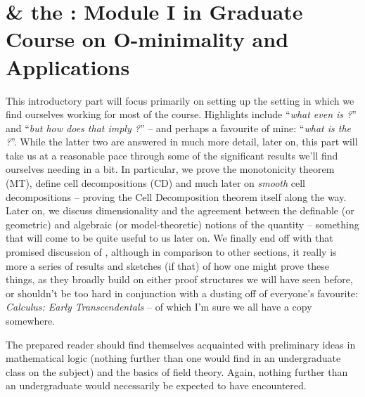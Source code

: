 % 
%
%

\setcounter{section}{1}
\setcounter{chapter}{0}

\chapter[\Omy \& the \pwT]{\Omy \& the \pwT: Module I in Graduate Course on O-minimality and Applications}
\noindent This introductory part will focus primarily on setting up the setting in which we find ourselves working for most of the course. Highlights include ``\emph{what even is \omy?}'' and ``\emph{but how does that imply \pw?}'' -- and perhaps a favourite of mine: ``\emph{what is the \pwt?}''. While the latter two are answered in much more detail, later on, this part will take us at a reasonable pace through some of the significant results we'll find ourselves needing in a bit. In particular, we prove the monotonicity theorem (MT), define cell decompositions (CD) and much later on \emph{smooth} cell decompositions -- proving the Cell Decomposition theorem itself along the way. Later on, we discuss dimensionality and the agreement between the definable (or geometric) and algebraic (or model-theoretic) notions of the quantity -- something that will come to be quite useful to us later on. We finally end off with that promised discussion of \scds, although in comparison to other sections, it really is more a series of results and sketches (if that) of how one might prove these things, as they broadly build on either proof structures we will have seen before, or shouldn't be too hard in conjunction with a dusting off of everyone's favourite: \textit{Calculus: Early Transcendentals} -- of which I'm sure we all have a copy somewhere.

The prepared reader should find themselves acquainted with preliminary ideas in mathematical logic (nothing further than one would find in an undergraduate class on the subject) and the basics of field theory. Again, nothing further than an undergraduate would necessarily be expected to have encountered.

